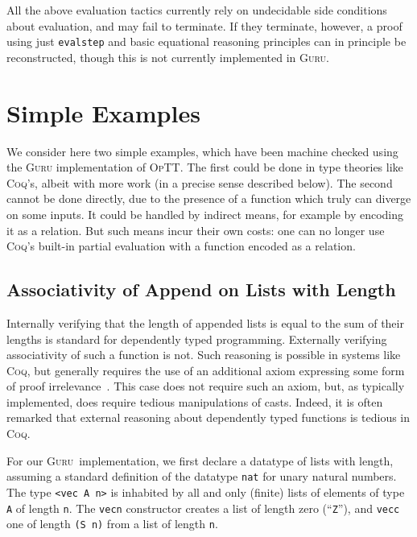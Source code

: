 \documentclass[9pt,natbib]{sigplanconf}
\newcommand{\optt}{\textsc{OpTT}}
\newcommand{\guru}[0]{\textsc{Guru}}
\begin{document}
All the above evaluation tactics currently rely on undecidable side
conditions about evaluation, and may fail to terminate.  If they
terminate, however, a proof using just \texttt{evalstep} and basic
equational reasoning principles can in principle be reconstructed,
though this is not currently implemented in \textsc{Guru}.

\section{Simple Examples}
\label{sec:eg}

We consider here two simple examples, which have been machine checked
using the \textsc{Guru} implementation of \optt.  The first could be
done in type theories like \textsc{Coq}'s, albeit with more work (in a
precise sense described below).  The second cannot be done directly,
due to the presence of a function which truly can diverge on some
inputs.  It could be handled by indirect means, for example by
encoding it as a relation.  But such means incur their own costs: one
can no longer use \textsc{Coq}'s built-in partial evaluation with a
function encoded as a relation.

\subsection{Associativity of Append on Lists with Length}

Internally verifying that the length of appended lists is equal to the
sum of their lengths is standard for dependently typed programming.
Externally verifying associativity of such a function is not.  Such
reasoning is possible in systems like \textsc{Coq}, but generally
requires the use of an additional axiom expressing some form of proof
irrelevance~\cite{hofmann+98,coq}.  This case does not require such an
axiom, but, as typically implemented, does require tedious
manipulations of casts.  Indeed, it is often remarked that external
reasoning about dependently typed functions is tedious in \textsc{Coq}.  

For our \guru\ implementation, we first declare a datatype of lists
with length, assuming a standard definition of the datatype
\texttt{nat} for unary natural numbers.  The type \texttt{<vec A n>}
is inhabited by all and only (finite) lists of elements of type
\texttt{A} of length \texttt{n}.  The \texttt{vecn} constructor
creates a list of length zero (``\texttt{Z}''), and \texttt{vecc} one
of length \texttt{(S n)} from a list of length \texttt{n}.
\end{document}
